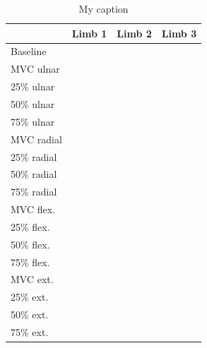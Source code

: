 \begin{table}[]
	\centering
	\caption{My caption}
	\label{my-label}
	\begin{tabular}{|l|l|l|l|}
		\hline
		& Limb 1 & Limb 2 & Limb 3 \\ \hline
		Baseline    &        &        &        \\ \hline
		MVC ulnar   &        &        &        \\ \hline
		25\% ulnar  &        &        &        \\ \hline
		50\% ulnar  &        &        &        \\ \hline
		75\% ulnar  &        &        &        \\ \hline
		MVC radial  &        &        &        \\ \hline
		25\% radial &        &        &        \\ \hline
		50\% radial &        &        &        \\ \hline
		75\% radial &        &        &        \\ \hline
		MVC flex.   &        &        &        \\ \hline
		25\% flex.  &        &        &        \\ \hline
		50\% flex.  &        &        &        \\ \hline
		75\% flex.  &        &        &        \\ \hline
		MVC ext.    &        &        &        \\ \hline
		25\% ext.   &        &        &        \\ \hline
		50\% ext.   &        &        &        \\ \hline
		75\% ext.   &        &        &        \\ \hline
	\end{tabular}
\end{table}